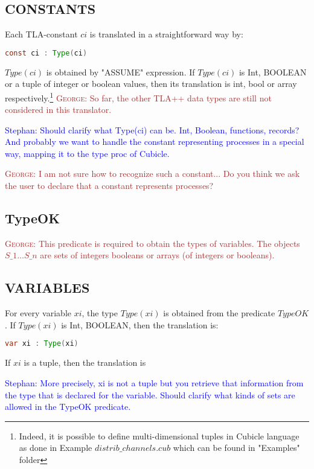 \documentclass{article}
\theoremstyle{plain}
\numberwithin{equation}{section}
\newcommand{\george}[1]{\textcolor{brown}{\textsc{George: } {\sf #1}}}
\newcommand{\ste}[1]{\par\noindent\textcolor{blue}{\small Stephan: #1}}
\begin{document}
\subsection{CONSTANTS} Each TLA-constant $ci$ is  translated in a straightforward  way  by:  
   
\begin{lstlisting}[language=Java]
const ci : Type(ci) 
\end{lstlisting}

\emph{$Type(ci)$} is obtained by "ASSUME" expression. If \emph{$Type(ci)$} is Int, BOOLEAN or a tuple of integer or boolean values, then its translation is int,  bool or array respectively.\footnote{Indeed, it is possible to define multi-dimensional tuples in Cubicle language as done in Example \emph{$distrib\_channels.cub$} which can be found in "Examples" folder} \george{So far, the other TLA++ data types are still not considered in this translator.  }  

\ste{Should clarify what Type(ci) can be. Int, Boolean, functions, records? And
  probably we want to handle the constant representing processes in a special
  way, mapping it to the type proc of Cubicle.}

\george{I am not sure how to recognize such a constant... Do you think we ask the user to declare that a constant represents processes?  }


\subsection*{TypeOK} \george{This predicate is required to obtain the types of variables. The objects $S\_1 \dots S\_n$ are sets of integers booleans or arrays (of integers or booleans).  } 




\subsection*{VARIABLES} For every variable $xi$, the type  \emph{$Type(xi)$} is obtained from the predicate \emph{$TypeOK$}. If \emph{$Type(xi)$} is Int, BOOLEAN, then the translation is: 

\begin{lstlisting}[language=Java]
var xi : Type(xi) 
\end{lstlisting}

If $xi$ is a tuple, then the translation is 

\ste{More precisely, xi is not a tuple but you retrieve that information from
  the type that is declared for the variable. Should clarify what kinds of sets
  are allowed in the TypeOK predicate.}
\end{document}
